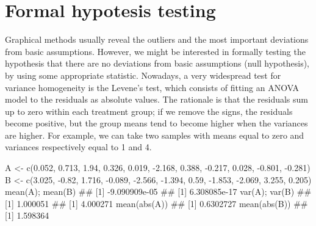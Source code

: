 \documentclass[a4paper,12pt,oneside]{book}
\newenvironment{Shaded}{\begin{snugshade}}{\end{snugshade}}
\newcommand{\FloatTok}[1]{#1}
\newcommand{\SpecialCharTok}[1]{#1}
\newcommand{\DocumentationTok}[1]{#1}
\newcommand{\OtherTok}[1]{#1}
\newcommand{\FunctionTok}[1]{#1}
\newcommand{\NormalTok}[1]{#1}
\begin{document}
\hypertarget{formal-hypotesis-testing}{%
\section{Formal hypotesis testing}\label{formal-hypotesis-testing}}

Graphical methods usually reveal the outliers and the most important deviations from basic assumptions. However, we might be interested in formally testing the hypothesis that there are no deviations from basic assumptions (null hypothesis), by using some appropriate statistic. Nowadays, a very widespread test for variance homogeneity is the Levene's test, which consists of fitting an ANOVA model to the residuals as absolute values. The rationale is that the residuals sum up to zero within each treatment group; if we remove the signs, the residuals become positive, but the group means tend to become higher when the variances are higher. For example, we can take two samples with means equal to zero and variances respectively equal to 1 and 4.

\begin{Shaded}
\begin{Highlighting}[]
\NormalTok{A }\OtherTok{\textless{}{-}} \FunctionTok{c}\NormalTok{(}\FloatTok{0.052}\NormalTok{, }\FloatTok{0.713}\NormalTok{, }\FloatTok{1.94}\NormalTok{, }\FloatTok{0.326}\NormalTok{, }\FloatTok{0.019}\NormalTok{, }\SpecialCharTok{{-}}\FloatTok{2.168}\NormalTok{, }\FloatTok{0.388}\NormalTok{,}
       \SpecialCharTok{{-}}\FloatTok{0.217}\NormalTok{, }\FloatTok{0.028}\NormalTok{, }\SpecialCharTok{{-}}\FloatTok{0.801}\NormalTok{, }\SpecialCharTok{{-}}\FloatTok{0.281}\NormalTok{)}
\NormalTok{B }\OtherTok{\textless{}{-}} \FunctionTok{c}\NormalTok{(}\FloatTok{3.025}\NormalTok{, }\SpecialCharTok{{-}}\FloatTok{0.82}\NormalTok{, }\FloatTok{1.716}\NormalTok{, }\SpecialCharTok{{-}}\FloatTok{0.089}\NormalTok{, }\SpecialCharTok{{-}}\FloatTok{2.566}\NormalTok{, }\SpecialCharTok{{-}}\FloatTok{1.394}\NormalTok{,}
       \FloatTok{0.59}\NormalTok{, }\SpecialCharTok{{-}}\FloatTok{1.853}\NormalTok{, }\SpecialCharTok{{-}}\FloatTok{2.069}\NormalTok{, }\FloatTok{3.255}\NormalTok{, }\FloatTok{0.205}\NormalTok{)}
\FunctionTok{mean}\NormalTok{(A); }\FunctionTok{mean}\NormalTok{(B)}
\DocumentationTok{\#\# [1] {-}9.090909e{-}05}
\DocumentationTok{\#\# [1] 6.308085e{-}17}
\FunctionTok{var}\NormalTok{(A); }\FunctionTok{var}\NormalTok{(B)}
\DocumentationTok{\#\# [1] 1.000051}
\DocumentationTok{\#\# [1] 4.000271}
\FunctionTok{mean}\NormalTok{(}\FunctionTok{abs}\NormalTok{(A))}
\DocumentationTok{\#\# [1] 0.6302727}
\FunctionTok{mean}\NormalTok{(}\FunctionTok{abs}\NormalTok{(B))}
\DocumentationTok{\#\# [1] 1.598364}
\end{Highlighting}
\end{Shaded}
\end{document}
